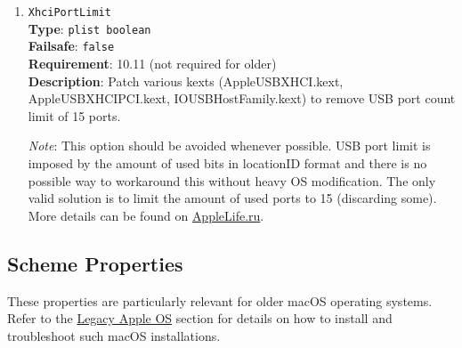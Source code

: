 \documentclass[]{article}
\begin{document}
\begin{enumerate}
\item
  \texttt{XhciPortLimit}\\
  \textbf{Type}: \texttt{plist\ boolean}\\
  \textbf{Failsafe}: \texttt{false}\\
  \textbf{Requirement}: 10.11 (not required for older)\\
  \textbf{Description}: Patch various kexts (AppleUSBXHCI.kext, AppleUSBXHCIPCI.kext,
  IOUSBHostFamily.kext) to remove USB port count limit of 15 ports.

  \emph{Note}: This option should be avoided whenever possible. USB port limit
  is imposed by the amount of used bits in locationID format and there is no
  possible way to workaround this without heavy OS modification. The only
  valid solution is to limit the amount of used ports to 15 (discarding some).
  More details can be found on \href{https://applelife.ru/posts/550233}{AppleLife.ru}.

\end{enumerate}

\subsection{Scheme Properties}\label{kernelpropsscheme}

These properties are particularly relevant for older macOS operating systems.
Refer to the \hyperref[legacyapple]{Legacy Apple OS} section for details on how
to install and troubleshoot such macOS installations.
\end{document}
